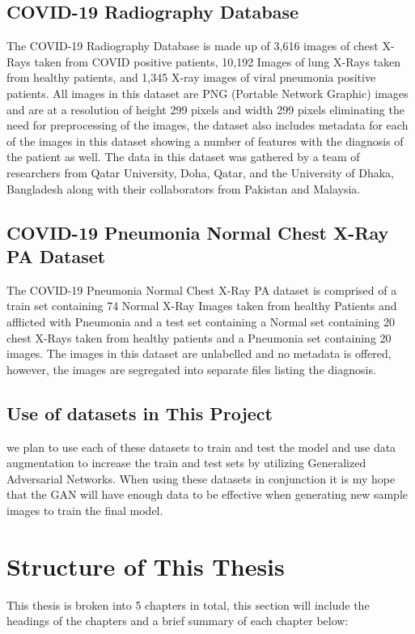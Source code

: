 \subsection{COVID-19 Radiography Database}
The COVID-19 Radiography Database is made up of 3,616 images of chest X-Rays taken from COVID positive patients, 10,192 Images of lung X-Rays taken from healthy patients, and 1,345 X-ray images of viral pneumonia positive patients. All images in this dataset are PNG (Portable Network Graphic) images and are at a resolution of height 299 pixels and width 299 pixels eliminating the need for preprocessing of the images, the dataset also includes metadata for each of the images in this dataset showing a number of features with the diagnosis of the patient as well. The data in this dataset was gathered by a team of researchers from Qatar University, Doha, Qatar, and the University of Dhaka, Bangladesh along with their collaborators from Pakistan and Malaysia.\cite{radiography}
\\
\subsection{COVID-19 Pneumonia Normal Chest X-Ray PA Dataset}
The COVID-19 Pneumonia Normal Chest X-Ray PA dataset is comprised of a train set containing 74 Normal X-Ray Images taken from healthy Patients and  afflicted with Pneumonia and a test set containing a Normal set containing 20 chest X-Rays taken from healthy patients and a Pneumonia set containing 20 images.  The images in this dataset are unlabelled and no metadata is offered, however, the images are segregated into separate files listing the diagnosis.\cite{covidDataset}
\\
\subsection{Use of datasets in This Project}
we plan to use each of these datasets to train and test the model and use data augmentation to increase the train and test sets by utilizing Generalized Adversarial Networks.  When using these datasets in conjunction it is my hope that the GAN will have enough data to be effective when generating new sample images to train the final model.

\section{Structure of This Thesis}
This thesis is broken into 5 chapters in total, this section will include the headings of the chapters and a brief summary of each chapter below:

